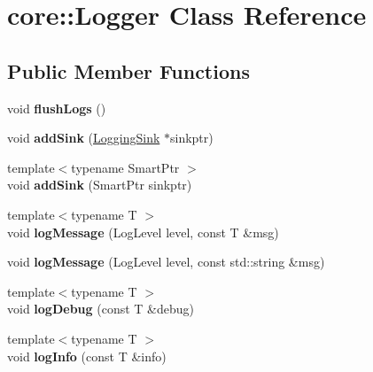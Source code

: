 \hypertarget{classcore_1_1_logger}{\section{core\-:\-:Logger Class Reference}
\label{classcore_1_1_logger}
}
\subsection*{Public Member Functions}
\begin{DoxyCompactItemize}
\item 
\hypertarget{classcore_1_1_logger_a8f7a64d642c3f3c70fbef58dcd6d464a}{void {\bfseries flush\-Logs} ()}\label{classcore_1_1_logger_a8f7a64d642c3f3c70fbef58dcd6d464a}

\item 
\hypertarget{classcore_1_1_logger_ad39beac03561fbd2a81c8dbbd24b2426}{void {\bfseries add\-Sink} (\hyperlink{classcore_1_1_logging_sink}{Logging\-Sink} $\ast$sinkptr)}\label{classcore_1_1_logger_ad39beac03561fbd2a81c8dbbd24b2426}

\item 
\hypertarget{classcore_1_1_logger_aa00cc782bd6280faae5c5d0816d68fb5}{{\footnotesize template$<$typename Smart\-Ptr $>$ }\\void {\bfseries add\-Sink} (Smart\-Ptr sinkptr)}\label{classcore_1_1_logger_aa00cc782bd6280faae5c5d0816d68fb5}

\item 
\hypertarget{classcore_1_1_logger_a31e5ca97f351541a0ad6aff857518b4d}{{\footnotesize template$<$typename T $>$ }\\void {\bfseries log\-Message} (Log\-Level level, const T \&msg)}\label{classcore_1_1_logger_a31e5ca97f351541a0ad6aff857518b4d}

\item 
\hypertarget{classcore_1_1_logger_ad6857fab3f9d615a606d12ca0e460e5e}{void {\bfseries log\-Message} (Log\-Level level, const std\-::string \&msg)}\label{classcore_1_1_logger_ad6857fab3f9d615a606d12ca0e460e5e}

\item 
\hypertarget{classcore_1_1_logger_ab757ec503a7caccfa653173276cbad47}{{\footnotesize template$<$typename T $>$ }\\void {\bfseries log\-Debug} (const T \&debug)}\label{classcore_1_1_logger_ab757ec503a7caccfa653173276cbad47}

\item 
\hypertarget{classcore_1_1_logger_a3cdcce0bca5dfd6d856336ddc6c27f98}{{\footnotesize template$<$typename T $>$ }\\void {\bfseries log\-Info} (const T \&info)}\label{classcore_1_1_logger_a3cdcce0bca5dfd6d856336ddc6c27f98}


\end{DoxyCompactItemize}
